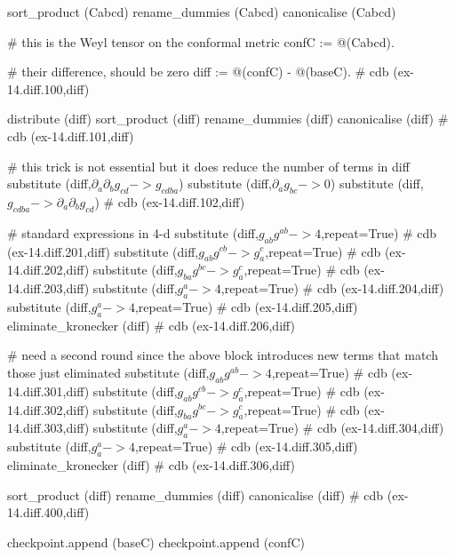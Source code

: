 \documentclass[12pt]{cdblatex}
\begin{document}
\begin{cadabra}
   sort_product   (Cabcd)
   rename_dummies (Cabcd)
   canonicalise   (Cabcd)

   # this is the Weyl tensor on the conformal metric
   confC := @(Cabcd).

   # their difference, should be zero
   diff := @(confC) - \phi @(baseC).  # cdb (ex-14.diff.100,diff)

   distribute     (diff)
   sort_product   (diff)
   rename_dummies (diff)
   canonicalise   (diff)  # cdb (ex-14.diff.101,diff)

   # this trick is not essential but it does reduce the number of terms in diff
   substitute     (diff,$\partial_{a}{\partial_{b}{g_{c d}}} -> g_{c d b a}$)
   substitute     (diff,$\partial_{a}{g_{b c}} -> 0$)
   substitute     (diff,$g_{c d b a} -> \partial_{a}{\partial_{b}{g_{c d}}}$)  # cdb (ex-14.diff.102,diff)

   # standard expressions in 4-d
   substitute     (diff,$g_{a b} g^{a b} -> 4$,repeat=True)          # cdb (ex-14.diff.201,diff)
   substitute     (diff,$g_{a b} g^{c b} -> g_{a}^{c}$,repeat=True)  # cdb (ex-14.diff.202,diff)
   substitute     (diff,$g_{b a} g^{b c} -> g_{a}^{c}$,repeat=True)  # cdb (ex-14.diff.203,diff)
   substitute     (diff,$g_{a}^{a} -> 4$,repeat=True)                # cdb (ex-14.diff.204,diff)
   substitute     (diff,$g^{a}_{a} -> 4$,repeat=True)                # cdb (ex-14.diff.205,diff)
   eliminate_kronecker (diff)                                        # cdb (ex-14.diff.206,diff)

   # need a second round since the above block introduces new terms that match those just eliminated
   substitute     (diff,$g_{a b} g^{a b} -> 4$,repeat=True)          # cdb (ex-14.diff.301,diff)
   substitute     (diff,$g_{a b} g^{c b} -> g_{a}^{c}$,repeat=True)  # cdb (ex-14.diff.302,diff)
   substitute     (diff,$g_{b a} g^{b c} -> g_{a}^{c}$,repeat=True)  # cdb (ex-14.diff.303,diff)
   substitute     (diff,$g_{a}^{a} -> 4$,repeat=True)                # cdb (ex-14.diff.304,diff)
   substitute     (diff,$g^{a}_{a} -> 4$,repeat=True)                # cdb (ex-14.diff.305,diff)
   eliminate_kronecker (diff)                                        # cdb (ex-14.diff.306,diff)

   sort_product   (diff)
   rename_dummies (diff)
   canonicalise   (diff)  # cdb (ex-14.diff.400,diff)

   checkpoint.append (baseC)
   checkpoint.append (confC)
\end{cadabra}

\clearpage
\end{document}

